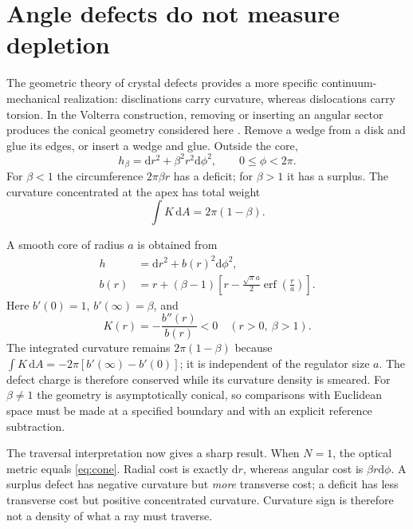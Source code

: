\documentclass[aps,prd,twocolumn,amsmath,amssymb,nofootinbib]{revtex4-2}
\newcommand{\dd}{\mathrm{d}}
\DeclareMathOperator{\erf}{erf}
\begin{document}
\section{Angle defects do not measure depletion}
\label{sec:defects}

The geometric theory of crystal defects provides a more specific
continuum-mechanical realization: disclinations carry curvature, whereas
dislocations carry torsion.  In the Volterra construction, removing or
inserting an angular sector produces the conical geometry considered here
\cite{kleinert-2000}.  Remove a wedge from a disk and glue its edges, or insert
a wedge and glue.  Outside the core,
\begin{equation}
 h_{\beta}=\dd r^2+\beta^2r^2\dd\phi^2,
 \qquad 0\leq\phi<2\pi.
 \label{eq:cone}
\end{equation}
For $\beta<1$ the circumference $2\pi\beta r$ has a deficit; for $\beta>1$
it has a surplus.  The curvature concentrated at the apex has total weight
\begin{equation}
 \int K\,\dd A=2\pi(1-\beta).
 \label{eq:conecurvature}
\end{equation}

A smooth core of radius $a$ is obtained from
\begin{align}
 h&=\dd r^2+b(r)^2\dd\phi^2,\nonumber\\
 b(r)&=r+(\beta-1)\left[
 r-\frac{\sqrt{\pi}a}{2}\erf\left(\frac{r}{a}\right)
 \right].
 \label{eq:smoothcone}
\end{align}
Here $b'(0)=1$, $b'(\infty)=\beta$, and
\begin{equation}
 K(r)=-\frac{b''(r)}{b(r)}<0
 \quad (r>0,\ \beta>1).
 \label{eq:smoothconecurvature}
\end{equation}
The integrated curvature remains $2\pi(1-\beta)$ because
$\int K\,\dd A=-2\pi[b'(\infty)-b'(0)]$; it is independent of the regulator
size $a$.  The defect charge is therefore conserved while its curvature
density is smeared.  For $\beta\neq1$ the geometry is asymptotically conical,
so comparisons with Euclidean space must be made at a specified boundary and
with an explicit reference subtraction.

The traversal interpretation now gives a sharp result.  When $N=1$, the
optical metric equals \eqref{eq:cone}.  Radial cost is exactly $\dd r$, whereas
angular cost is $\beta r\dd\phi$.  A surplus defect has negative curvature but
\emph{more} transverse cost; a deficit has less transverse cost but positive
concentrated curvature.  Curvature sign is therefore not a density of what a
ray must traverse.
\end{document}
